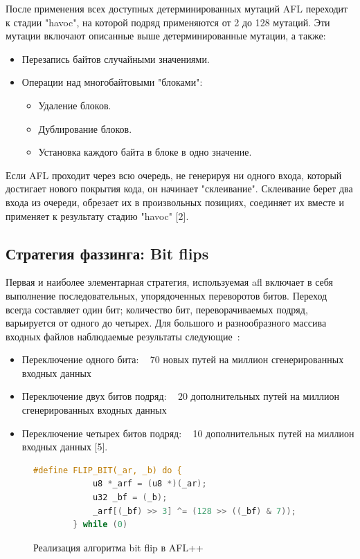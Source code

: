 После применения всех доступных детерминированных мутаций AFL переходит к стадии "havoc", на которой подряд применяются от 2 до 128 мутаций. Эти мутации включают описанные выше детерминированные мутации, а также:
\begin{itemize}
	\item Перезапись байтов случайными значениями.
	\item Операции над многобайтовыми "блоками":
	\begin{itemize}
		\item Удаление блоков.
		\item Дублирование блоков.
		\item Установка каждого байта в блоке в одно значение.
	\end{itemize}
\end{itemize}

Если AFL проходит через всю очередь, не генерируя ни одного входа, который достигает нового покрытия кода, он начинает "склеивание". Склеивание берет два входа из очереди, обрезает их в произвольных позициях, соединяет их вместе и применяет к результату стадию "havoc"  [2].

\subsection{Стратегия фаззинга: Bit flips} \label{ch2:bit-flips}
Первая и наиболее элементарная стратегия, используемая afl включает в себя выполнение последовательных, упорядоченных переворотов битов. Переход всегда составляет один бит; количество бит, переворачиваемых подряд, варьируется от одного до четырех. Для большого и разнообразного массива входных файлов наблюдаемые результаты следующие~\cite{???}:

\begin{itemize}
	\item Переключение одного бита: ~ 70 новых путей на миллион сгенерированных входных данных
	\item Переключение двух битов подряд: ~ 20 дополнительных путей на миллион сгенерированных входных данных
	\item Переключение четырех битов подряд: ~ 10 дополнительных путей на миллион входных данных [5].
\end{itemize}

\begin{figure}[ht]
	\begin{lstlisting}[language=C]
		#define FLIP_BIT(_ar, _b) do { 
			u8 *_arf = (u8 *)(_ar);      
			u32 _bf = (_b);              
			_arf[(_bf) >> 3] ^= (128 >> ((_bf) & 7)); 
		} while (0)
	\end{lstlisting}
	\caption{Реализация алгоритма bit flip в AFL++~\cite{???}}\label{fig:flip-bit}
\end{figure}

